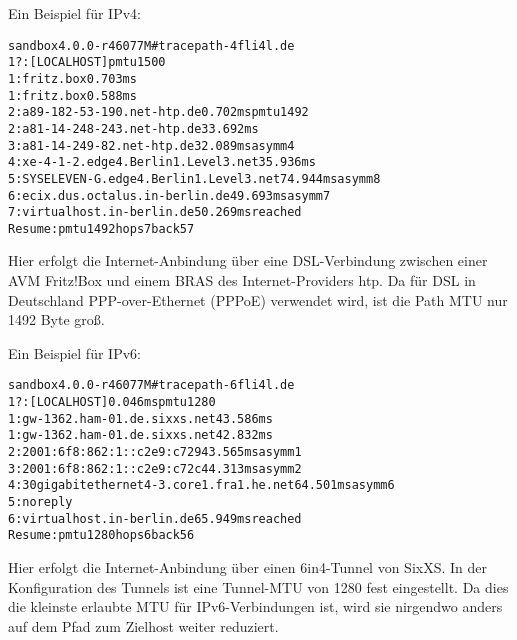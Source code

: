 \begin{description}
    Ein Beispiel für IPv4:
    \begin{example}
    \begin{alltt}
    sandbox 4.0.0-r46077M \# tracepath -4 fli4l.de
     1?: [LOCALHOST]                                         pmtu 1500
     1:  fritz.box                                             0.703ms 
     1:  fritz.box                                             0.588ms 
     2:  a89-182-53-190.net-htp.de                             0.702ms pmtu 1492
     2:  a81-14-248-243.net-htp.de                            33.692ms 
     3:  a81-14-249-82.net-htp.de                             32.089ms asymm  4 
     4:  xe-4-1-2.edge4.Berlin1.Level3.net                    35.936ms
     5:  SYSELEVEN-G.edge4.Berlin1.Level3.net                 74.944ms asymm  8
     6:  ecix.dus.octalus.in-berlin.de                        49.693ms asymm  7
     7:  virtualhost.in-berlin.de                             50.269ms reached
         Resume: pmtu 1492 hops 7 back 57
    \end{alltt}
    \end{example}
    Hier erfolgt die Internet-Anbindung über eine DSL-Verbindung zwischen einer
    AVM Fritz!Box und einem BRAS des Internet-Providers htp. Da für DSL in
    Deutschland PPP-over-Ethernet (PPPoE) verwendet wird, ist die Path MTU
    nur 1492 Byte groß.

    Ein Beispiel für IPv6:
    \begin{example}
    \begin{alltt}
    sandbox 4.0.0-r46077M \# tracepath -6 fli4l.de
     1?: [LOCALHOST]                        0.046ms pmtu 1280
     1:  gw-1362.ham-01.de.sixxs.net                          43.586ms
     1:  gw-1362.ham-01.de.sixxs.net                          42.832ms
     2:  2001:6f8:862:1::c2e9:c729                            43.565ms asymm  1
     3:  2001:6f8:862:1::c2e9:c72c                            44.313ms asymm  2
     4:  30gigabitethernet4-3.core1.fra1.he.net               64.501ms asymm  6
     5:  no reply
     6:  virtualhost.in-berlin.de                             65.949ms reached
         Resume: pmtu 1280 hops 6 back 56
    \end{alltt}
    \end{example}
    Hier erfolgt die Internet-Anbindung über einen 6in4-Tunnel von SixXS. In
    der Konfiguration des Tunnels ist eine Tunnel-MTU von 1280 fest eingestellt.
    Da dies die kleinste erlaubte MTU für IPv6-Verbindungen ist, wird sie
    nirgendwo anders auf dem Pfad zum Zielhost weiter reduziert.


\end{description}
